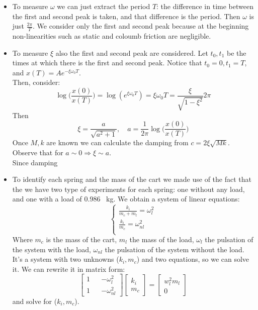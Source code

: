 \begin{itemize}

\item {To measure $\omega$ we can just extract the period $T$:  the difference in time between the first and second peak is taken, and that difference is the period. Then $\omega$ is just $\frac{2\pi}{T}$. We consider only the first and second peak because  at the beginning non-linearities such as static  and coloumb friction are negligible. }

\item {To measure $\xi$ also the first and second peak are considered. Let $t_0, t_1$ be the times at which there is the first and second peak. Notice that $t_0=0, t_1=T$, and $x(T)= Ae^{-\xi \omega_0 T}$.\\
Then, consider:
$$\log \Big(\frac{x(0)}{x(T)}\Big) =  \log(e^{\xi \omega_0 T}) = \xi \omega_0 T = \frac{\xi}{\sqrt{1-\xi^2}} 2\pi$$
Then $$\xi = \frac{a}{\sqrt{a^2+1}}, \quad a = \frac{1}{2\pi}\log \Big(\frac{x(0)}{x(T)}\Big)$$
Once $M,k$ are known we can calculate the damping from $c= 2\xi \sqrt{Mk}$. Observe that for $a \sim 0 \Rightarrow \xi \sim a$. \\ Since damping
}

\item {To identify each spring and the mass of the cart we made use of the fact that the we have two type of experiments for each spring: one without any load, and one with a load of  $0.986$ \SI{}{\kilo\gram}. We obtain a system of linear equations:
$$
\begin{cases}
\frac{k_i}{m_c+m_l} = \omega_l^2 \\
\frac{k_i}{m_c} = \omega_{nl}^2 \\
\end{cases}
$$
Where $m_c$ is the mass of the cart, $m_l$ the mass of the load, $\omega_l$ the pulsation of the system with the load, $\omega_{nl}$ the pulsation of the system without the load. It's a system with two unknowns ($k_i, m_c$) and two equations, so we can solve it. We can rewrite it in matrix form:
$$\begin{bmatrix}
1  && - \omega_l^2 \\
1 && -\omega_{nl}^2
\end{bmatrix}  
\begin{bmatrix}
k_i \\ m_c
\end{bmatrix}  
=\begin{bmatrix}
w_l^2 m_l \\
0
\end{bmatrix}  
$$
and solve for ($k_i, m_c$).
}


\end{itemize}
